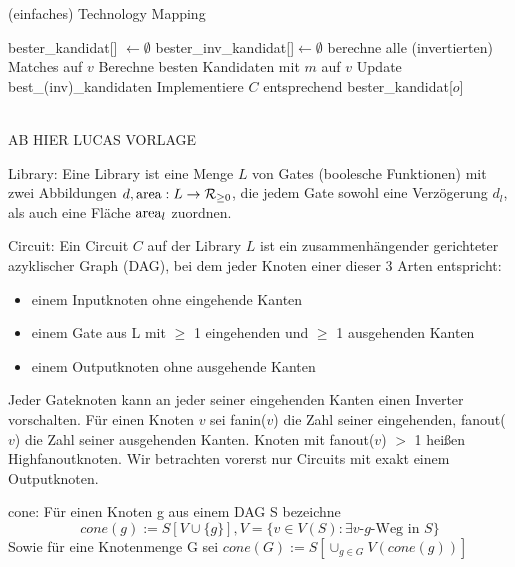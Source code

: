 \documentclass[11pt, a4paper, german]{article}
\begin{document}
\begin{algorithm}[H]
 \LinesNumbered
 \DontPrintSemicolon
 \caption{(einfaches) Technology Mapping}

 bester\_kandidat[] $\gets \emptyset$\;
 bester\_inv\_kandidat[]$ \gets \emptyset$\;
 {
   berechne alle (invertierten) Matches auf $v$\;
   {
      Berechne besten Kandidaten mit $m$ auf $v$\;
      Update best\_(inv)\_kandidaten\;
   }
 }
 Implementiere $C$ entsprechend bester\_kandidat[$o$]\;
\end{algorithm}\ \\




AB HIER LUCAS VORLAGE

\begin{definition}{Library: }Eine Library ist eine Menge $L$ von Gates (boolesche Funktionen) mit zwei Abbildungen $d, \text{area}: L \to \mathcal{R}_{\geq 0}$, die jedem Gate sowohl eine Verzögerung $d_l$, als auch eine Fl\"ache $\text{area}_l$ zuordnen.
\end{definition}

\begin{figure}
 
\end{figure}


\begin{definition}{Circuit: }Ein Circuit $C$ auf der Library $L$ ist ein zusammenhängender gerichteter azyklischer Graph (DAG), bei dem jeder Knoten einer dieser 3 Arten entspricht:
 \begin{itemize}
  \item einem Inputknoten ohne eingehende Kanten
  \item einem Gate aus L mit $\geq$ 1 eingehenden und $\geq$ 1 ausgehenden Kanten
  \item einem Outputknoten ohne ausgehende Kanten
 \end{itemize}
 Jeder Gateknoten kann an jeder seiner eingehenden Kanten einen Inverter vorschalten.
 Für einen Knoten $v$ sei fanin($v$) die Zahl seiner eingehenden, fanout($v$) die Zahl seiner ausgehenden Kanten. Knoten mit fanout($v$) $>$ 1 heißen Highfanoutknoten. Wir betrachten vorerst nur Circuits mit exakt einem Outputknoten.
\end{definition}

\begin{definition}{cone: }Für einen Knoten g aus einem DAG S bezeichne \[cone\left(g\right) := S\left[V\cup\lbrace g\rbrace\right], V = \lbrace v \in V(S) : \exists \text{$v$-$g$-Weg in } S\rbrace\]
Sowie für eine Knotenmenge G sei $cone(G) := S\left[\cup_{g \in G}{V(cone(g))}\right]$
 
\end{definition}
\end{document}
